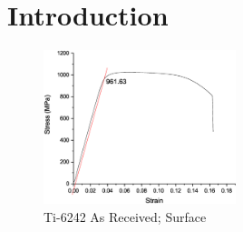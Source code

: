 \chapter{Introduction}

\begin{figure}[H]
    \centering
        \includegraphics[width=0.50\textwidth]{../test/images/Ti6242-1.5-TS-Graph}
        \caption{Ti-6242 As Received; Surface}
    \label{fig:EDM-Cut}
\end{figure}
